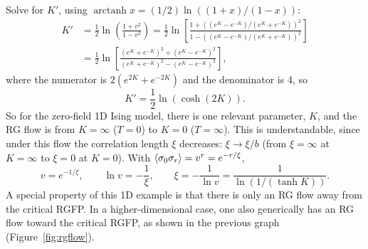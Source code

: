 Solve for $K'$, using $\operatorname{arctanh}x = (1/2)\ln\left((1+x)/(1-x)\right)$:
\begin{align}
  K' &= \frac{1}{2}\ln\left(\frac{1+v^2}{1-v^2}\right)
     = \frac{1}{2}\ln\left[\frac{1+\left((e^K-e^{-K})/(e^K+e^{-K})\right)^2}{1-\left((e^K-e^{-K})/(e^K+e^{-K})\right)^2}\right]\nonumber\\
     &= \frac{1}{2}\ln\left[\frac{(e^K+e^{-K})^2+(e^K-e^{-K})^2}{(e^K+e^{-K})^2-(e^K-e^{-K})^2}\right],
\end{align}
where the numerator is $2(e^{2K}+e^{-2K})$ and the denominator is 4, so
\begin{equation}
  \boxed{K' = \frac{1}{2}\ln\left(\cosh(2K)\right)}.
\end{equation}
So for the zero-field 1D Ising model, there is one relevant parameter, $K$, and the RG flow is from
$K = \infty$ ($T = 0$) to $K = 0$ ($T = \infty$). This is understandable, since under this flow the
correlation length $\xi$ decreases: $\xi\to\xi/b$ (from $\xi = \infty$ at $K = \infty$ to $\xi = 0$ at
$K = 0$). With $\langle \sigma_0\sigma_r\rangle = v^r = e^{-r/\xi}$,
\begin{equation}
  v = e^{-1/\xi},\qquad \ln v = -\frac{1}{\xi},\qquad
  \xi = -\frac{1}{\ln v} = \frac{1}{\ln\left(1/(\tanh K)\right)}.
\end{equation}
A special property of this 1D example is that there is only an RG flow away from the critical RGFP. In a
higher-dimensional case, one also generically has an RG flow toward the critical RGFP, as shown in the
previous graph (Figure~\ref{fig:rgflow}).
